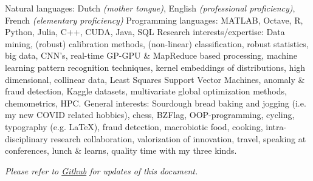 \documentclass[10pt,a4paper]{article}
\begin{document}
\vspace{0.5em}
\inlineheadsection
{Natural languages:}
{Dutch \emph{(mother tongue)}, English \emph{(professional proficiency)}, French \emph{(elementary proficiency)}}
\vspace{0.5em}
\inlineheadsection
{Programming languages:}
{MATLAB, Octave, R, Python, Julia, C++, CUDA, Java, SQL} %
\vspace{0.5em}
\inlineheadsection	
{Research interests/expertise:}
{Data mining, (robust) calibration methods, (non-linear) classification, robust statistics, big data, CNN's, real-time GP-GPU \& MapReduce based processing, machine learning pattern recognition techniques, kernel embeddings of distributions, high dimensional, collinear data, Least Squares Support Vector Machines, anomaly \& fraud detection, Kaggle datasets, multivariate global optimization methods, chemometrics, HPC.}
\vspace{0.5em}
\inlineheadsection	
  {General interests:}
  {Sourdough bread baking and jogging (i.e. my new COVID related hobbies), chess, BZFlag, OOP-programming, cycling, typography (e.g. \LaTeX), fraud detection, macrobiotic food, cooking, intra-disciplinary research collaboration, valorization of innovation, travel, speaking at conferences, lunch \& learns, quality time with my three kinds.}

\vspace{+2em} 
\begin{center}
	\emph{\small Please refer to \href{https://github.com/ivranckx/CV_Iwein_Vranckx/blob/main/iwein-vranckx-resume.pdf}{Github} for updates of this document.}
\end{center}
\spacedhrule{-0.2em}{-0.4em}
\end{document}
